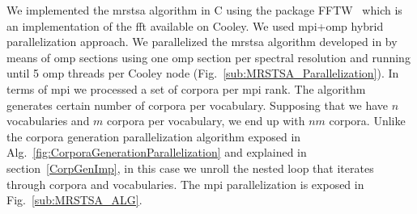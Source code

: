 \documentclass[10pt,journal,compsoc]{IEEEtran}
\begin{document}
We implemented the \gls{mrstsa} algorithm in C using the package FFTW~\cite{fftw} which is an implementation of the \gls{fft} available on Cooley. We used \gls{mpi}+\gls{omp} hybrid parallelization approach. We parallelized the \gls{mrstsa} algorithm developed in \cite{Dematties2018} by means of \gls{omp} sections using one \gls{omp} section per spectral resolution and running until 5 \gls{omp} threads per Cooley node (Fig.~\ref{sub:MRSTSA_Parallelization}). In terms of \gls{mpi} we processed a set of corpora per \gls{mpi} rank. The algorithm generates certain number of corpora per vocabulary. Supposing that we have $n$ vocabularies and $m$ corpora per vocabulary, we end up with $n m$ corpora. Unlike the corpora generation parallelization algorithm exposed in Alg.~\ref{fig:CorporaGenerationParallelization} and explained in section~\ref{CorpGenImp}, in this case we unroll the nested loop that iterates through corpora and vocabularies. The \gls{mpi} parallelization is exposed in Fig.~\ref{sub:MRSTSA_ALG}.


\end{document}
